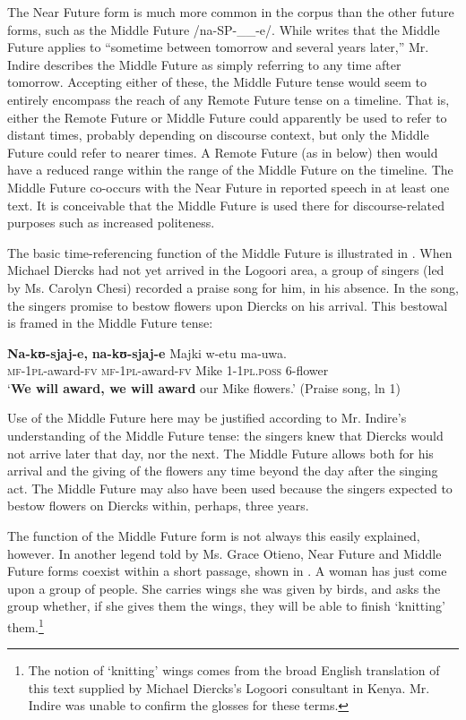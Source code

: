 \documentclass[output=paper]{langsci/langscibook}
\begin{document}
The Near Future form is much more common in the corpus than the other future forms, such as the Middle Future /na-SP-\_\_-e/. While \citet[285]{Leung1991} writes that the Middle Future applies to “sometime between tomorrow and several years later,” Mr. Indire describes the Middle Future as simply referring to any time after tomorrow. Accepting either of these, the Middle Future tense would seem to entirely encompass the reach of any Remote Future tense on a timeline. That is, either the Remote Future or Middle Future could apparently be used to refer to distant times, probably depending on discourse context, but only the Middle Future could refer to nearer times. A Remote Future (as in  below) then would have a reduced range within the range of the Middle Future on the timeline. %
%
The Middle Future co-occurs with the Near Future in reported speech in at least one text. It is conceivable that the Middle Future is used there for discourse-related purposes such as increased politeness. 

The basic time-referencing function of the Middle Future is illustrated in . When Michael Diercks had not yet arrived in the Logoori area, a group of singers (led by Ms. Carolyn Chesi) recorded a praise song for him, in his absence. In the song, the singers promise to bestow flowers upon Diercks on his arrival. This bestowal is framed in the Middle Future tense:

\ea\label{ex:sarvasy:12}
\gll \textbf{Na-kʊ-sjaj-e,}    \textbf{na-kʊ-sjaj-e}    Majki  w-etu    ma-uwa. \\
\textsc{mf-1pl}-award-\textsc{fv}  \textsc{mf-1pl-}award-\textsc{fv}  Mike  1-\textsc{1pl.poss}  6-flower \\
\glt ‘\textbf{We will award, we will award} our Mike flowers.’ (Praise song, ln 1)
\z

Use of the Middle Future here may be justified according to Mr. Indire’s understanding of the Middle Future tense: the singers knew that Diercks would not arrive later that day, nor the next. The Middle Future allows both for his arrival and the giving of the flowers any time beyond the day after the singing act. The Middle Future may also have been used because the singers expected to bestow flowers on Diercks within, perhaps, three years. 

The function of the Middle Future form is not always this easily explained, however. In another legend told by Ms. Grace Otieno, Near Future and Middle Future forms coexist within a short passage, shown in . A woman has just come upon a group of people. She carries wings she was given by birds, and asks the group whether, if she gives them the wings, they will be able to finish ‘knitting’ them.\footnote{The notion of ‘knitting’ wings comes from the broad English translation of this text supplied by Michael Diercks’s Logoori consultant in Kenya. Mr. Indire was unable to confirm the glosses for these terms.}
\end{document}

